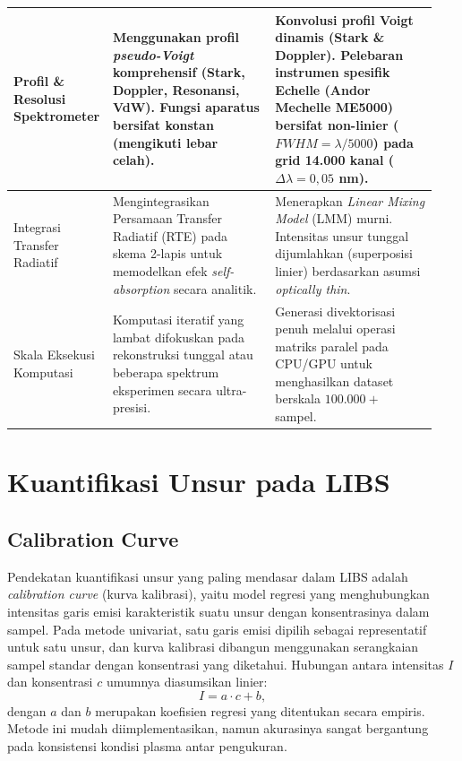 {\begin{longtable}{|>{\raggedright\arraybackslash}p{0.18\linewidth}|>{\raggedright\arraybackslash}p{0.38\linewidth}|>{\raggedright\arraybackslash}p{0.38\linewidth}|}
Profil \& Resolusi Spektrometer & 
Menggunakan profil \textit{pseudo-Voigt} komprehensif (Stark, Doppler, Resonansi, VdW). Fungsi aparatus bersifat konstan (mengikuti lebar celah). & 
Konvolusi profil Voigt dinamis (Stark \& Doppler). Pelebaran instrumen spesifik Echelle (Andor Mechelle ME5000) bersifat non-linier ($FWHM = \lambda / 5000$) pada grid 14.000 kanal ($\Delta\lambda = 0,05$ nm). \\
\hline

Integrasi Transfer Radiatif & 
Mengintegrasikan Persamaan Transfer Radiatif (RTE) pada skema 2-lapis untuk memodelkan efek \textit{self-absorption} secara analitik. & 
Menerapkan \textit{Linear Mixing Model} (LMM) murni. Intensitas unsur tunggal dijumlahkan (superposisi linier) berdasarkan asumsi \textit{optically thin}. \\
\hline

Skala Eksekusi Komputasi & 
Komputasi iteratif yang lambat difokuskan pada rekonstruksi tunggal atau beberapa spektrum eksperimen secara ultra-presisi. & 
Generasi divektorisasi penuh melalui operasi matriks paralel pada CPU/GPU untuk menghasilkan dataset berskala $100.000+$ sampel. \\
\hline
\end{longtable}
}


\section{Kuantifikasi Unsur pada LIBS}

\subsection{Calibration Curve}

Pendekatan kuantifikasi unsur yang paling mendasar dalam LIBS adalah \textit{calibration curve} (kurva kalibrasi), yaitu model regresi yang menghubungkan intensitas garis emisi karakteristik suatu unsur dengan konsentrasinya dalam sampel. Pada metode univariat, satu garis emisi dipilih sebagai representatif untuk satu unsur, dan kurva kalibrasi dibangun menggunakan serangkaian sampel standar dengan konsentrasi yang diketahui. Hubungan antara intensitas $I$ dan konsentrasi $c$ umumnya diasumsikan linier:
%
\begin{equation}
    I = a \cdot c + b,
\end{equation}
%
dengan $a$ dan $b$ merupakan koefisien regresi yang ditentukan secara empiris. Metode ini mudah diimplementasikan, namun akurasinya sangat bergantung pada konsistensi kondisi plasma antar pengukuran.

